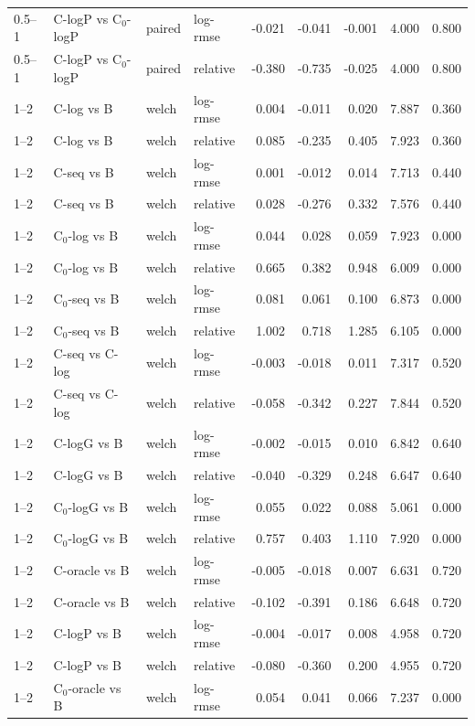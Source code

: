\begin{longtable}{llllrrrrr}
0.5–1 & C-logP vs C$_0$-logP & paired & log-rmse & -0.021 & -0.041 & -0.001 & 4.000 & 0.800 \\
0.5–1 & C-logP vs C$_0$-logP & paired & relative & -0.380 & -0.735 & -0.025 & 4.000 & 0.800 \\
1–2 & C-log vs B & welch & log-rmse & 0.004 & -0.011 & 0.020 & 7.887 & 0.360 \\
1–2 & C-log vs B & welch & relative & 0.085 & -0.235 & 0.405 & 7.923 & 0.360 \\
1–2 & C-seq vs B & welch & log-rmse & 0.001 & -0.012 & 0.014 & 7.713 & 0.440 \\
1–2 & C-seq vs B & welch & relative & 0.028 & -0.276 & 0.332 & 7.576 & 0.440 \\
1–2 & C$_0$-log vs B & welch & log-rmse & 0.044 & 0.028 & 0.059 & 7.923 & 0.000 \\
1–2 & C$_0$-log vs B & welch & relative & 0.665 & 0.382 & 0.948 & 6.009 & 0.000 \\
1–2 & C$_0$-seq vs B & welch & log-rmse & 0.081 & 0.061 & 0.100 & 6.873 & 0.000 \\
1–2 & C$_0$-seq vs B & welch & relative & 1.002 & 0.718 & 1.285 & 6.105 & 0.000 \\
1–2 & C-seq vs C-log & welch & log-rmse & -0.003 & -0.018 & 0.011 & 7.317 & 0.520 \\
1–2 & C-seq vs C-log & welch & relative & -0.058 & -0.342 & 0.227 & 7.844 & 0.520 \\
1–2 & C-logG vs B & welch & log-rmse & -0.002 & -0.015 & 0.010 & 6.842 & 0.640 \\
1–2 & C-logG vs B & welch & relative & -0.040 & -0.329 & 0.248 & 6.647 & 0.640 \\
1–2 & C$_0$-logG vs B & welch & log-rmse & 0.055 & 0.022 & 0.088 & 5.061 & 0.000 \\
1–2 & C$_0$-logG vs B & welch & relative & 0.757 & 0.403 & 1.110 & 7.920 & 0.000 \\
1–2 & C-oracle vs B & welch & log-rmse & -0.005 & -0.018 & 0.007 & 6.631 & 0.720 \\
1–2 & C-oracle vs B & welch & relative & -0.102 & -0.391 & 0.186 & 6.648 & 0.720 \\
1–2 & C-logP vs B & welch & log-rmse & -0.004 & -0.017 & 0.008 & 4.958 & 0.720 \\
1–2 & C-logP vs B & welch & relative & -0.080 & -0.360 & 0.200 & 4.955 & 0.720 \\
1–2 & C$_0$-oracle vs B & welch & log-rmse & 0.054 & 0.041 & 0.066 & 7.237 & 0.000 \\

\end{longtable}
